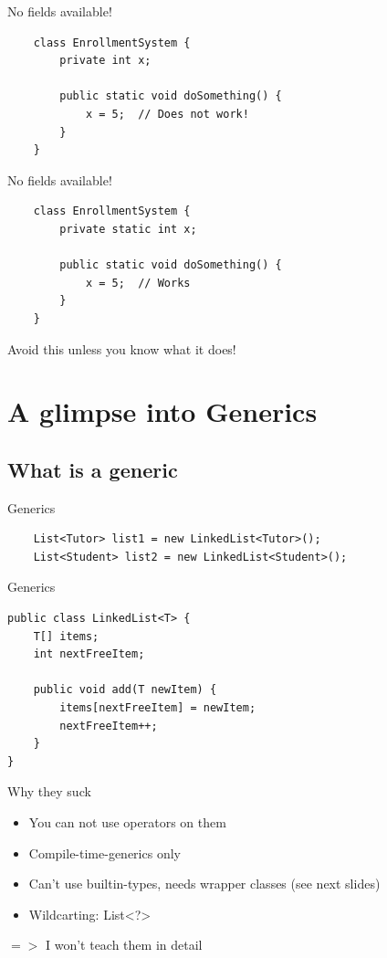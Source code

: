 \begin{frame}[fragile]{No fields available!}
\begin{lstlisting}
	class EnrollmentSystem {
		private int x;
		
		public static void doSomething() {
			x = 5;  // Does not work!
		}
	}
\end{lstlisting}
\end{frame}

\begin{frame}[fragile]{No fields available!}
\begin{lstlisting}
	class EnrollmentSystem {
		private static int x;
		
		public static void doSomething() {
			x = 5;  // Works
		}
	}
\end{lstlisting}
Avoid this unless you know what it does!
\end{frame}

\section{A glimpse into Generics}
\subsection{What is a generic}
\begin{frame}[fragile]{Generics}
	\begin{lstlisting}
	List<Tutor> list1 = new LinkedList<Tutor>();
	List<Student> list2 = new LinkedList<Student>();
	\end{lstlisting}

\end{frame}

\begin{frame}[fragile]{Generics}
\begin{lstlisting}
public class LinkedList<T> {
	T[] items;
	int nextFreeItem;
	
	public void add(T newItem) {
		items[nextFreeItem] = newItem;
		nextFreeItem++;
	}
}
\end{lstlisting}
\end{frame}

\begin{frame}{Why they suck}
	\begin{itemize}
		\item You can not use operators on them
		\item Compile-time-generics only
		\item Can't use builtin-types, needs wrapper classes (see next slides)
		\item Wildcarting: List<?>
	\end{itemize}
	$=>$ I won't teach them in detail
\end{frame}

